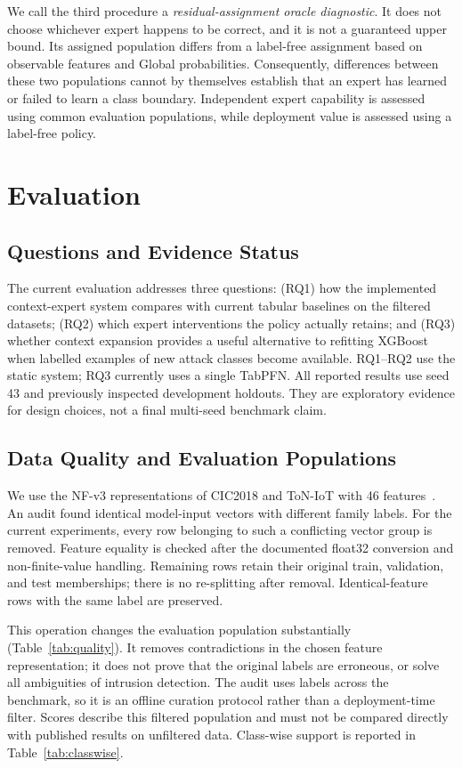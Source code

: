 \documentclass[sigconf,anonymous,pbalance]{acmart}
\begin{document}
We call the third procedure a \emph{residual-assignment oracle diagnostic}. It does not choose whichever expert happens to be correct, and it is not a guaranteed upper bound. Its assigned population differs from a label-free assignment based on observable features and Global probabilities. Consequently, differences between these two populations cannot by themselves establish that an expert has learned or failed to learn a class boundary. Independent expert capability is assessed using common evaluation populations, while deployment value is assessed using a label-free policy.

\section{Evaluation}
\label{sec:eval}
\subsection{Questions and Evidence Status}
The current evaluation addresses three questions: (RQ1) how the implemented context-expert system compares with current tabular baselines on the filtered datasets; (RQ2) which expert interventions the policy actually retains; and (RQ3) whether context expansion provides a useful alternative to refitting XGBoost when labelled examples of new attack classes become available. RQ1--RQ2 use the static system; RQ3 currently uses a single TabPFN. All reported results use seed 43 and previously inspected development holdouts. They are exploratory evidence for design choices, not a final multi-seed benchmark claim.

\subsection{Data Quality and Evaluation Populations}
We use the NF-v3 representations of CIC2018 and ToN-IoT with 46 features~\cite{luay2025NetFlowDatasetsV3}. An audit found identical model-input vectors with different family labels. For the current experiments, every row belonging to such a conflicting vector group is removed. Feature equality is checked after the documented float32 conversion and non-finite-value handling. Remaining rows retain their original train, validation, and test memberships; there is no re-splitting after removal. Identical-feature rows with the same label are preserved.



This operation changes the evaluation population substantially (Table~\ref{tab:quality}). It removes contradictions in the chosen feature representation; it does not prove that the original labels are erroneous, or solve all ambiguities of intrusion detection. The audit uses labels across the benchmark, so it is an offline curation protocol rather than a deployment-time filter. Scores describe this filtered population and must not be compared directly with published results on unfiltered data. Class-wise support is reported in Table~\ref{tab:classwise}.
\end{document}
